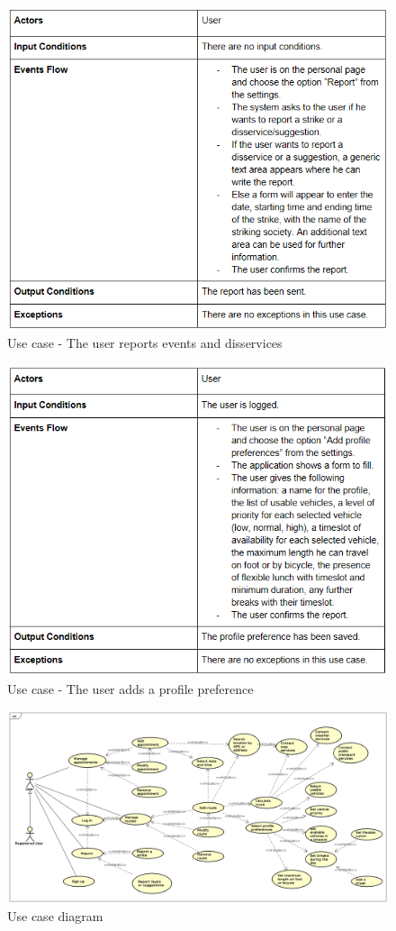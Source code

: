 \begin{figure}
	\centering
	\includegraphics{Images/UseCaseTables/9_usr_report.PNG}
	\caption{\label{fig:useCase9}Use case - The user reports events and disservices  }
\end{figure}

\begin{figure}
	\centering
	\includegraphics{Images/UseCaseTables/10_usr_add_pro_pref.PNG}
	\caption{\label{fig:useCase10}Use case - The user adds a profile preference  }
\end{figure}


\begin{figure}
	\centering
	\includegraphics[width=\textwidth]{Images/UseCase_Diagram.png}
	\caption{\label{fig:useCaseDiagram}Use case diagram  }
\end{figure}